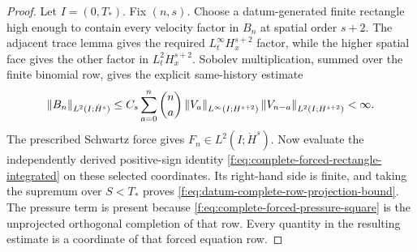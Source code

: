 \begin{proof}
Let \(I=(0,T_*)\).  Fix \((n,s)\).  Choose a datum-generated finite rectangle high enough to
contain every velocity factor in \(B_n\) at spatial order \(s+2\).
The adjacent trace lemma gives the required \(L^\infty_tH^{s+2}_x\) factor,
while the higher spatial face gives the other factor in
\(L^2_tH^{s+2}_x\).  Sobolev multiplication, summed over the finite binomial
row, gives the explicit same-history estimate
\begin{equation}
 \left\lVert B_n\right\rVert_{L^2(I;\dot H^s)}
 \le C_s\sum_{a=0}^{n}\binom na
 \left\lVert V_a\right\rVert_{L^\infty(I;H^{s+2})}
 \left\lVert V_{n-a}\right\rVert_{L^2(I;H^{s+2})}
 <\infty.
 \label{f:eq:datum-complete-binomial-projection-bound}
\end{equation}
The prescribed Schwartz force gives
\(F_n\in L^2(I;\dot H^s)\).  Now evaluate the independently derived
positive-sign identity \eqref{f:eq:complete-forced-rectangle-integrated} on
these selected coordinates.  Its right-hand side is finite, and taking the
supremum over \(S<T_*\) proves
\eqref{f:eq:datum-complete-row-projection-bound}.  The pressure term is present
because \eqref{f:eq:complete-forced-pressure-square} is the unprojected
orthogonal completion of that row.  Every quantity in the resulting
estimate is a coordinate of that forced equation row.
\end{proof}

